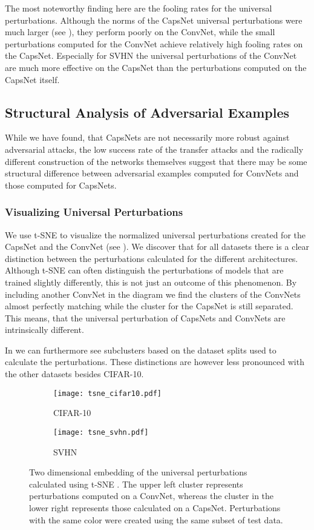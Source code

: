 The most noteworthy finding here are the fooling rates for the universal perturbations.
Although the norms of the CapsNet universal perturbations were much larger (see ), they perform poorly on the ConvNet, while the small perturbations computed for the ConvNet achieve relatively high fooling rates on the CapsNet.
Especially for SVHN the universal perturbations of the ConvNet are much more effective on the CapsNet than the perturbations computed on the CapsNet itself.

\subsection{Structural Analysis of Adversarial Examples}

While we have found, that CapsNets are not necessarily more robust against adversarial attacks, the low success rate of the transfer attacks and the radically different construction of the networks themselves suggest that there may be some structural difference between adversarial examples computed for ConvNets and those computed for CapsNets.

\subsubsection{Visualizing Universal Perturbations}

We use t-SNE \citep{tsne} to visualize the normalized universal perturbations created for the CapsNet and the ConvNet (see ).
We discover that for all datasets there is a clear distinction between the perturbations calculated for the different architectures.
Although t-SNE can often distinguish the perturbations of models that are trained slightly differently, this is not just an outcome of this phenomenon.
By including another ConvNet in the diagram we find the clusters of the ConvNets almost perfectly matching while the cluster for the CapsNet is still separated.
This means, that the universal perturbation of CapsNets and ConvNets are intrinsically different.

In  we can furthermore see subclusters based on the dataset splits used to calculate the perturbations.
These distinctions are however less pronounced with the other datasets besides CIFAR-10.

\begin{figure}
	\centering
	\begin{subfigure}{.5\textwidth}
	\texttt{[image: tsne\_cifar10.pdf]}
	\caption{CIFAR-10}
	\end{subfigure}%
	\begin{subfigure}{.5\textwidth}
	\texttt{[image: tsne\_svhn.pdf]}
	\caption{SVHN}
	\end{subfigure}
	\caption[t-SNE Plot of universal perturbations]{Two dimensional embedding of the universal perturbations calculated using t-SNE \citep{tsne}. The upper left cluster represents perturbations computed on a ConvNet, whereas the cluster in the lower right represents those calculated on a CapsNet. Perturbations with the same color were created using the same subset of test data.}
	\label{fig:tsne}
\end{figure}


